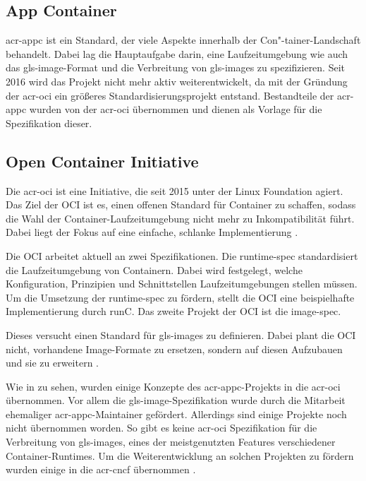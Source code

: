 \subsection{App Container}
\label{sec:appc}
\Gls{acr-appc} ist ein Standard, der viele Aspekte innerhalb der Con"-tainer-Landschaft behandelt. Dabei lag die Hauptaufgabe darin, eine Laufzeitumgebung wie auch das \gls{gls-image}-Format und die Verbreitung von \glspl{gls-image} zu spezifizieren. Seit 2016 wird das Projekt nicht mehr aktiv weiterentwickelt, da mit der Gründung der \gls{acr-oci} ein größeres Standardisierungsprojekt entstand. Bestandteile der \gls{acr-appc} wurden von der \gls{acr-oci} übernommen und dienen als Vorlage für die Spezifikation dieser.

\subsection{Open Container Initiative}
\label{sec:oci}
Die \gls{acr-oci} ist eine Initiative, die seit 2015 unter der Linux Foundation agiert. Das Ziel der OCI ist es, einen offenen Standard für Container zu schaffen, sodass die Wahl der Container-Laufzeitumgebung nicht mehr zu Inkompatibilität führt. Dabei liegt der Fokus auf eine einfache, schlanke Implementierung \citep{OpenContainerInitiative}. 

Die OCI arbeitet aktuell an zwei Spezifikationen. Die runtime-spec standardisiert die Laufzeitumgebung  von Containern. Dabei wird festgelegt, welche Konfiguration, Prinzipien und Schnittstellen Laufzeitumgebungen stellen müssen. Um die Umsetzung der runtime-spec zu fördern, stellt die OCI eine beispielhafte Implementierung durch runC. Das zweite Projekt der OCI ist die image-spec. 

Dieses versucht einen Standard für \glspl{gls-image} zu definieren. Dabei plant die OCI nicht, vorhandene Image-Formate zu ersetzen, sondern auf diesen Aufzubauen und sie zu erweitern \citep{OpenContainerInitiative}.

Wie in  zu sehen, wurden einige Konzepte des \gls{acr-appc}-Projekts in die \gls{acr-oci} übernommen. Vor allem die \gls{gls-image}-Spezifikation wurde durch die Mitarbeit ehemaliger \gls{acr-appc}-Maintainer gefördert. Allerdings sind einige Projekte noch nicht übernommen worden. So gibt es keine \gls{acr-oci} Spezifikation für die Verbreitung von \glspl{gls-image}, eines der meistgenutzten Features verschiedener Container-Runtimes. Um die Weiterentwicklung an solchen Projekten zu fördern wurden einige in die \gls{acr-cncf} übernommen \citep{MakingSenseofContainerStandardsandFoundations:OCICNCFAppcandRkt}.

